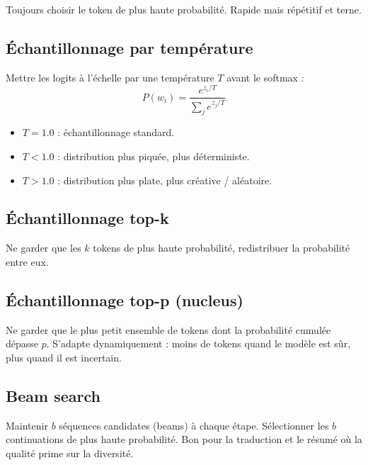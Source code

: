 Toujours choisir le token de plus haute probabilit\'e. Rapide mais r\'ep\'etitif et terne.

\subsection{\'Echantillonnage par temp\'erature}

Mettre les logits \`a l'\'echelle par une temp\'erature $T$ avant le softmax :
\[
P(w_i) = \frac{e^{z_i / T}}{\sum_j e^{z_j / T}}
\]
\begin{itemize}
  \item $T = 1.0$ : \'echantillonnage standard.
  \item $T < 1.0$ : distribution plus piqu\'ee, plus d\'eterministe.
  \item $T > 1.0$ : distribution plus plate, plus cr\'eative / al\'eatoire.
\end{itemize}

\subsection{\'Echantillonnage top-k}

Ne garder que les $k$ tokens de plus haute probabilit\'e, redistribuer la probabilit\'e entre eux.

\subsection{\'Echantillonnage top-p (nucleus)}

Ne garder que le plus petit ensemble de tokens dont la probabilit\'e cumul\'ee d\'epasse $p$. S'adapte dynamiquement : moins de tokens quand le mod\`ele est s\^ur, plus quand il est incertain.

\subsection{Beam search}

Maintenir $b$ s\'equences candidates (beams) \`a chaque \'etape. S\'electionner les $b$ continuations de plus haute probabilit\'e. Bon pour la traduction et le r\'esum\'e o\`u la qualit\'e prime sur la diversit\'e.

